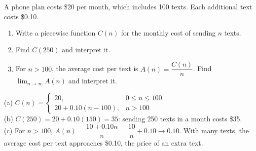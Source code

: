 \begin{exo}{}
A phone plan costs \$20 per month, which includes 100 texts. Each additional text costs \$0.10.
\begin{enumerate}[label=(\alph*)]
\item Write a piecewise function $C(n)$ for the monthly cost of sending $n$ texts.
\item Find $C(250)$ and interpret it.
\item For $n>100$, the average cost per text is $A(n)=\dfrac{C(n)}{n}$. Find $\displaystyle\lim_{n\to\infty}A(n)$ and interpret it.
\end{enumerate}
\begin{solution}
(a) $C(n)=\begin{cases}20, & 0\le n\le100\\ 20+0.10(n-100), & n>100\end{cases}$\\
(b) $C(250)=20+0.10(150)=35$: sending 250 texts in a month costs \$35.\\
(c) For $n>100$, $A(n)=\dfrac{10+0.10n}{n}=\dfrac{10}{n}+0.10\to0.10$. With many texts, the average cost per text approaches \$0.10, the price of an extra text.
\end{solution}
\end{exo}

